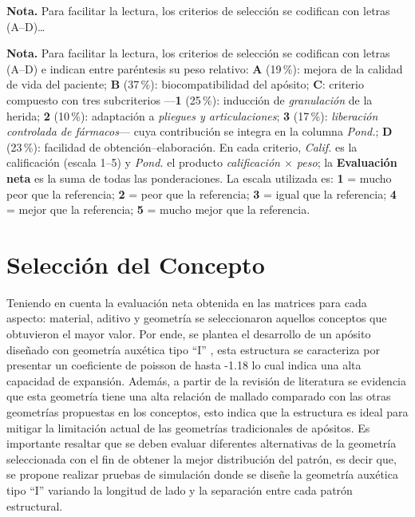 \documentclass[../../DocumentoCompleto.tex]{subfiles}
\begin{document}
\begin{center}
	\begin{minipage}{0.96\textwidth}
		\centering
		\textbf{Nota.} Para facilitar la lectura, los criterios de selección se codifican con letras (A–D)… 
	\end{minipage}
\end{center}


\begin{center}
\begin{minipage}{0.96\textwidth}
\centering
\textbf{Nota.} Para facilitar la lectura, los criterios de selección se codifican con letras (A–D) e indican entre paréntesis su peso relativo: 
\textbf{A} (19\,\%): mejora de la calidad de vida del paciente; 
\textbf{B} (37\,\%): biocompatibilidad del apósito; 
\textbf{C}: criterio compuesto con tres subcriterios —\textbf{1} (25\,\%): inducción de \textit{granulación} de la herida; \textbf{2} (10\,\%): adaptación a \textit{pliegues y articulaciones}; \textbf{3} (17\,\%): \textit{liberación controlada de fármacos}— cuya contribución se integra en la columna \textit{Pond.}; 
\textbf{D} (23\,\%): facilidad de obtención–elaboración. 
En cada criterio, \textit{Calif.} es la calificación (escala 1–5) y \textit{Pond.} el producto \emph{calificación $\times$ peso}; la \textbf{Evaluación neta} es la suma de todas las ponderaciones. 
La escala utilizada es: \textbf{1} = mucho peor que la referencia; \textbf{2} = peor que la referencia; \textbf{3} = igual que la referencia; \textbf{4} = mejor que la referencia; \textbf{5} = mucho mejor que la referencia.
\end{minipage}
\end{center}


  \section{Selección del Concepto}
  Teniendo en cuenta la evaluación neta obtenida en las matrices para cada aspecto: material, aditivo y geometría se seleccionaron aquellos conceptos que obtuvieron el mayor valor. Por ende, se plantea el desarrollo de un apósito diseñado con  geometría auxética tipo “I” , esta estructura se caracteriza por presentar un coeficiente de poisson de hasta -1.18 lo cual indica una alta capacidad de expansión. Además, a partir de la revisión de literatura se evidencia que esta geometría tiene una alta relación de mallado comparado con las otras geometrías propuestas en los conceptos, esto indica que la estructura es ideal para mitigar la limitación actual de las geometrías tradicionales de apósitos. Es importante resaltar que se deben evaluar diferentes alternativas de la geometría seleccionada con el fin de obtener la mejor distribución del patrón, es decir que, se propone realizar pruebas de simulación donde se diseñe la geometría auxética tipo “I” variando la longitud de lado y la separación entre cada patrón estructural. 
  
\end{document}
